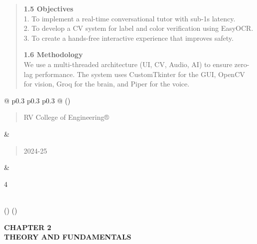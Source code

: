 \documentclass[]{article}
\begin{document}
\begin{quote}
\textbf{1.5 Objectives} \\
1. To implement a real-time conversational tutor with sub-1s latency. \\
2. To develop a CV system for label and color verification using EasyOCR. \\
3. To create a hands-free interactive experience that improves safety.

\textbf{1.6 Methodology} \\
We use a multi-threaded architecture (UI, CV, Audio, AI) to ensure zero-lag performance. The system uses CustomTkinter for the GUI, OpenCV for vision, Groq for the brain, and Piper for the voice.
\end{quote}

\begin{longtable}[]{@{} p{0.3\textwidth} p{0.3\textwidth} p{0.3\textwidth} @{}}
\toprule()
\begin{minipage}[b]{\linewidth}\raggedright
\begin{quote}
RV College of Engineering®
\end{quote}
\end{minipage} & \begin{minipage}[b]{\linewidth}\raggedright
\begin{quote}
2024-25
\end{quote}
\end{minipage} & \begin{minipage}[b]{\linewidth}\raggedright
4
\end{minipage} \\
\midrule()
\endhead
\bottomrule()
\end{longtable}

\newpage

\textbf{CHAPTER 2} \\
\textbf{THEORY AND FUNDAMENTALS}
\end{document}
